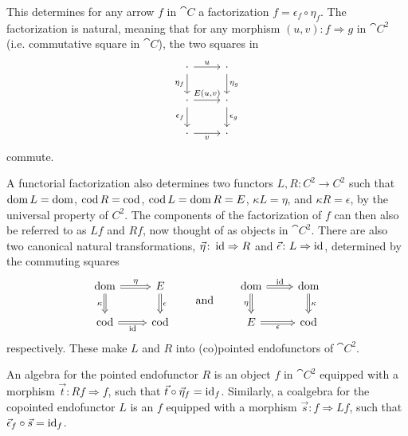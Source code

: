 This determines for any arrow $f$ in $\cat{C}$ a factorization $f=\epsilon_f\circ\eta_f$. The factorization is natural, meaning that for any morphism $(u,v)\colon f\Rightarrow g$ in $\cat{C}^2$ (i.e. commutative square in $\cat{C}$), the two squares in
\[
\begin{tikzcd}
	\cdot \rar{u} \dar[swap]{\eta_f} & \cdot \dar{\eta_g} \\
	\cdot \rar{E(u,v)} \dar[swap]{\epsilon_f} & \cdot \dar{\epsilon_g} \\
	\cdot \rar[swap]{v} & \cdot
\end{tikzcd}
\]
commute.

A functorial factorization also determines two functors $L,R\colon C^2\to C^2$ such that $\operatorname{dom} L=\operatorname{dom}$, $\operatorname{cod} R=\operatorname{cod}$, $\operatorname{cod} L = \operatorname{dom} R = E$, $\kappa L = \eta$, and $\kappa R=\epsilon$, by the universal property of $C^2$. The components of the factorization of $f$ can then also be referred to as $Lf$ and $Rf$, now thought of as objects in $\cat{C}^2$. There are also two canonical natural transformations, $\vec{\eta}\colon \operatorname{id}\Rightarrow R$ and $\vec{\epsilon}\colon L\Rightarrow\operatorname{id}$, determined by the commuting squares
\[
\begin{tikzcd}[arrows=Rightarrow]
	\dom \rar{\eta} \dar[swap]{\kappa} & E \dar{\epsilon} \\
	\cod \rar[swap]{\id} & \cod
\end{tikzcd}
\qquad\text{and}\qquad
\begin{tikzcd}[arrows=Rightarrow]
	\dom \rar{\id} \dar[swap]{\eta} & \dom \dar{\kappa} \\
	E \rar[swap]{\epsilon} & \cod
\end{tikzcd}
\]
respectively. These make $L$ and $R$ into (co)pointed endofunctors of $\cat{C}^2$.

An algebra for the pointed endofunctor $R$ is an object $f$ in $\cat{C}^2$ equipped with a morphism $\vec{t}\colon Rf\Rightarrow f$, such that $\vec{t}\circ\vec{\eta}_f=\operatorname{id}_f$. Similarly, a coalgebra for the copointed endofunctor $L$ is an $f$ equipped with a morphism $\vec{s}\colon f\Rightarrow Lf$, such that $\vec{\epsilon}_f\circ\vec{s}=\operatorname{id}_f$.

